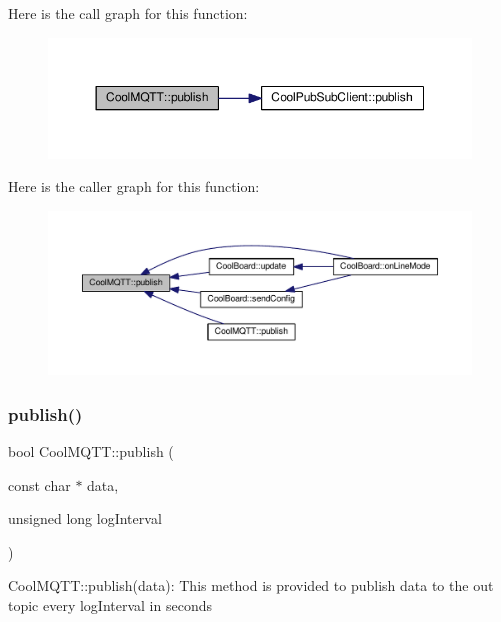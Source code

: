 Here is the call graph for this function\+:\nopagebreak
\begin{figure}[H]
\begin{center}
\leavevmode
\includegraphics[width=350pt]{class_cool_m_q_t_t_ace977b3e90ab14b1199fe5c4fb0a13ec_cgraph}
\end{center}
\end{figure}
Here is the caller graph for this function\+:\nopagebreak
\begin{figure}[H]
\begin{center}
\leavevmode
\includegraphics[width=350pt]{class_cool_m_q_t_t_ace977b3e90ab14b1199fe5c4fb0a13ec_icgraph}
\end{center}
\end{figure}
\mbox{\label{class_cool_m_q_t_t_a613c5e3927ae85bb94fbf648d84d8780}} 
\subsubsection{\texorpdfstring{publish()}{publish()}\hspace{0.1cm}{\footnotesize\ttfamily [2/2]}}
{\footnotesize\ttfamily bool Cool\+M\+Q\+T\+T\+::publish (\begin{DoxyParamCaption}\item[{const char $\ast$}]{data,  }\item[{unsigned long}]{log\+Interval }\end{DoxyParamCaption})}

Cool\+M\+Q\+T\+T\+::publish(data)\+: This method is provided to publish data to the out topic every log\+Interval in seconds


